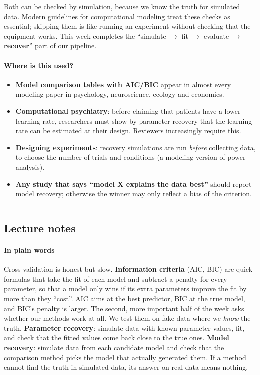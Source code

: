 Both can be checked by simulation, because we know the truth for
simulated data. Modern guidelines for computational modeling treat these
checks as essential; skipping them is like running an experiment without
checking that the equipment works. This week completes the ``simulate \ensuremath{\rightarrow}
fit \ensuremath{\rightarrow} evaluate \ensuremath{\rightarrow} \textbf{recover}'' part of our pipeline.

\paragraph{Where is this used?}

\begin{itemize}
\tightlist
\item
  \textbf{Model comparison tables with AIC/BIC} appear in almost every
  modeling paper in psychology, neuroscience, ecology and economics.
\item
  \textbf{Computational psychiatry}: before claiming that patients have
  a lower learning rate, researchers must show by parameter recovery
  that the learning rate can be estimated at their design. Reviewers
  increasingly require this.
\item
  \textbf{Designing experiments}: recovery simulations are run
  \emph{before} collecting data, to choose the number of trials and
  conditions (a modeling version of power analysis).
\item
  \textbf{Any study that says ``model X explains the data best''} should
  report model recovery; otherwise the winner may only reflect a bias of
  the criterion.
\end{itemize}

\begin{center}\rule{0.5\linewidth}{0.5pt}\end{center}


\subsection{Lecture notes}

\paragraph{In plain words}

Cross-validation is honest but slow. \textbf{Information criteria} (AIC,
BIC) are quick formulas that take the fit of each model and subtract a
penalty for every parameter, so that a model only wins if its extra
parameters improve the fit by more than they ``cost''. AIC aims at the
best predictor, BIC at the true model, and BIC's penalty is larger. The
second, more important half of the week asks whether our methods work at
all. We test them on fake data where we \emph{know} the truth.
\textbf{Parameter recovery}: simulate data with known parameter values,
fit, and check that the fitted values come back close to the true ones.
\textbf{Model recovery}: simulate data from each candidate model and
check that the comparison method picks the model that actually generated
them. If a method cannot find the truth in simulated data, its answer on
real data means nothing.

